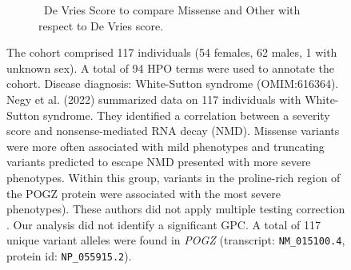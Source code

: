 \begin{figure}[htbp]
\vspace{2em}

\begin{subfigure}[b]{0.95\textwidth}
\captionsetup{justification=raggedright,singlelinecheck=false}
\caption{ De Vries Score to compare Missense and Other with respect to De Vries score. }
\end{subfigure}

\vspace{2em}

\caption{ The cohort comprised 117 individuals (54 females, 62 males, 1 with unknown sex). A total of 94 HPO terms were used to annotate the cohort. Disease diagnosis: White-Sutton syndrome (OMIM:616364). Negy et al. (2022) summarized data on 117 individuals with White-Sutton syndrome. They identified a correlation 
between a severity score and nonsense-mediated RNA decay (NMD). Missense variants were more often associated with mild phenotypes 
and truncating variants predicted to escape NMD presented with more severe phenotypes. Within this group, variants in the 
proline-rich region of the POGZ protein were associated with the most severe phenotypes).
 These authors did not apply multiple testing correction \cite{PMID_35052493}.
Our analysis did not identify a significant GPC. A total of 117 unique variant alleles were found in \textit{POGZ} (transcript: \texttt{NM\_015100.4}, protein id: \texttt{NP\_055915.2}).}
\end{figure}

